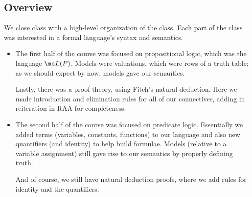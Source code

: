 \subsection{Overview}
We close class with a high-level organization of the class. Each part of the class was interested in a formal language's syntax and semantics.
\begin{itemize}
	\item The first half of the course was focused on propositional logic, which was the language $\mc L(P)$. Models were valuations, which were rows of a truth table; as we should expect by now, models gave our semantics.

	Lastly, there was a proof theory, using Fitch's natural deduction. Here we made introduction and elimination rules for all of our connectives, adding in reiteration in RAA for completeness.

	\item The second half of the course was focused on predicate logic. Essentially we added terms (variables, constants, functions) to our language and also new quantifiers (and identity) to help build formulae. Models (relative to a variable assignment) still gave rise to our semantics by properly defining truth.

	And of course, we still have natural deduction proofs, where we add rules for identity and the quantifiers.
\end{itemize}